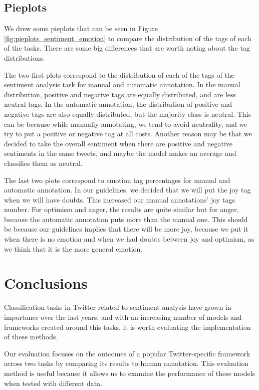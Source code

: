 \documentclass[11pt,a4paper]{article}
\begin{document}
\subsection{Pieplots}

We drew some pieplots that can be seen in Figure \ref{fig:pieplots_sentiment_emotion} to compare the distribution of the tags of each of the tasks. There are some big differences that are worth noting about the tag distributions.

The two first plots correspond to the distribution of each of the tags of the sentiment analysis task for manual and automatic annotation. In the manual distribution, positive and negative tags are equally distributed, and are less neutral tags. In the automatic annotation, the distribution of positive and negative tags are also equally distributed, but the majority class is neutral. This can be because while manually annotating, we tend to avoid neutrality, and we try to put a positive or negative tag at all costs. Another reason may be that we decided to take the overall sentiment when there are positive and negative sentiments in the same tweets, and maybe the model makes an average and classifies them as neutral.

The last two plots correspond to emotion tag percentages for manual and automatic annotation. In our guidelines, we decided that we will put the joy tag when we will have doubts. This increased our manual annotations' joy tags number. For optimism and anger, the results are quite similar but for anger, because the automatic annotation puts more than the manual one. This should be because our guidelines implies that there will be more joy, because we put it when there is no emotion and when we had doubts between joy and optimism, as we think that it is the more general emotion.

\section{Conclusions}

Classification tasks in Twitter related to sentiment analysis have grown in importance over the last years, and with an increasing number of models and frameworks created around this tasks, it is worth evaluating the implementation of these methods. 

Our evaluation focuses on the outcomes of a popular Twitter-specific framework across two tasks by comparing its results to human annotation. This evaluation method is useful because it allows us to examine the performance of these models when tested with different data.
\end{document}
